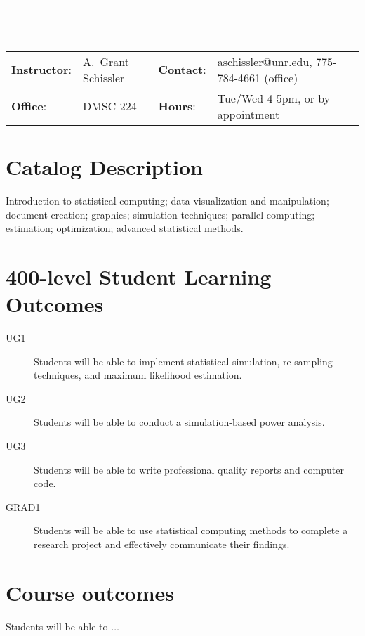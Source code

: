 \documentclass[11pt,onecolumn]{article}
\title{\textbf{\coursename}}
\author{{\semester}---{\roomnumb}---{\classtimes}}
\date{}
\makeatletter
\newcommand{\myname}{A.~Grant Schissler}
\newcommand{\myemail}{aschissler@unr.edu}
\newcommand{\office}{DMSC 224}
\newcommand{\officehours}{Tue/Wed 4-5pm, or by appointment}
\makeatother
\begin{document}
\maketitle

\vspace{-0.25in}
\noindent\makebox[\linewidth]{\rule{\textwidth}{1pt}}

\begin{center}
\begin{tabular}{llll}
\textbf{Instructor}:&\myname & \textbf{Contact}:&\href{mailto:\myemail}{\myemail}, 775-784-4661 (office)\\
\textbf{Office}:&\office & \textbf{Hours}:&\officehours\\
\end{tabular}
\end{center}

\section*{Catalog Description}
Introduction to statistical computing; data visualization and manipulation; document creation; graphics; simulation techniques; parallel computing; estimation; optimization; advanced statistical methods.

\section*{400-level Student Learning Outcomes}

\begin{description}
\item[UG1] Students will be able to implement statistical simulation, re-sampling techniques, and maximum likelihood estimation. 
\item[UG2] Students will be able to conduct a simulation-based power analysis. 
\item[UG3] Students will be able to write professional quality reports and computer code.
\item[GRAD1] Students will be able to use statistical computing methods to complete a research project and effectively communicate their findings.
\end{description}

\section*{Course outcomes}

Students will be able to $\ldots$
\end{document}
